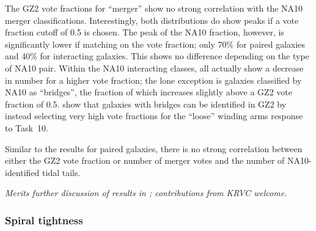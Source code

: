 \documentclass[useAMS,usenatbib]{mn2e}
\begin{document}
The GZ2 vote fractions for ``merger'' show no strong correlation with the NA10 merger classifications. Interestingly, both distributions do show peaks if a vote fraction cutoff of 0.5 is chosen. The peak of the NA10 fraction, however, is significantly lower if matching on the vote fraction; only 70\% for paired galaxies and 40\% for interacting galaxies. This shows no difference depending on the type of NA10 pair. Within the NA10 interacting classes, all actually show a decrease in number for a higher vote fraction; the lone exception is galaxies classified by NA10 as ``bridges'', the fraction of which increases slightly above a GZ2 vote fraction of 0.5. \citet{cas13} show that galaxies with bridges can be identified in GZ2 by instead selecting very high vote fractions for the ``loose'' winding arms response to Task~10. 

Similar to the results for paired galaxies, there is no strong correlation between either the GZ2 vote fraction or number of merger votes and the number of NA10-identified tidal tails. 

{\em Merits further discussion of results in \citet{cas13}; contributions from KRVC welcome.}

\subsubsection{Spiral tightness}
\end{document}
